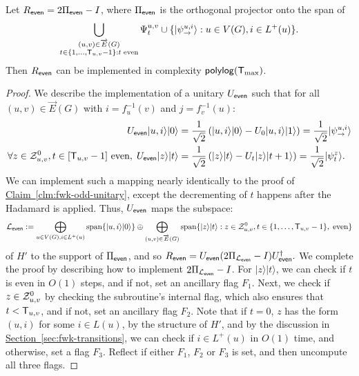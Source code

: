 \documentclass{article}
\renewcommand{\sec}[1]{\hyperref[sec:#1]{Section~\ref*{sec:#1}}}
\newcommand{\clm}[1]{\hyperref[clm:#1]{Claim~\ref*{clm:#1}}}
\def\ket#1{{\lvert}#1\rangle}
\renewcommand{\>}{\rangle}
\newcommand{\<}{\langle}
\renewcommand{\(}{\left(}
\renewcommand{\)}{\right)}
\begin{document}
\begin{claim}\label{clm:fwk-even-unitary}
Let $R_{\sf even} =2\Pi_{\sf even}-I$, where $\Pi_{\sf even}$ is the orthogonal projector onto the span of
$$\bigcup_{\substack{(u,v)\in\overrightarrow{E}(G)\\t\in\{1,\dots,{\sf T}_{u,v}-1\}: t\;\mathrm{ even}}}\Psi_t^{u,v}\cup\{\ket{\psi_{\rightarrow}^{u,i}}:u\in V(G),i\in L^+(u)\}.$$
Then $R_{\sf even}$ can be implemented in complexity ${\sf polylog}({\sf T}_{\max})$. 
\end{claim}
\begin{proof}
We describe the implementation of a unitary $U_{\sf even}$ such that for all $(u,v)\in\overrightarrow{E}(G)$ with $i=f_u^{-1}(v)$ and $j=f_v^{-1}(u)$:
\vskip-18pt
\begin{equation*}
\begin{split}
U_{\sf even}\ket{u,i}\ket{0} &= \frac{1}{\sqrt{2}}\left(\ket{u,i}\ket{0} - U_0\ket{u,i}\ket{1} \right)
= \frac{1}{\sqrt{2}}\ket{\psi_{\rightarrow}^{u,i}}\\
\forall z\in {\cal Z}_{u,v}^0, t\in [{\sf T}_{u,v}-1]\text{ even}, \;%
U_{\sf even}\ket{z}\ket{t} &= \frac{1}{\sqrt{2}}\left(\ket{z}\ket{t} -U_t\ket{z}\ket{t+1}\right) 
= \frac{1}{\sqrt{2}}\ket{\psi_{t}^z}.
\end{split}\label{eq:U-S-1}
\end{equation*}
We can implement such a mapping nearly identically to the proof of \clm{fwk-odd-unitary}, except the decrementing of $t$ happens after the Hadamard is applied. Thus, $U_{\sf even}$ maps the subspace:
$${\cal L}_{\sf even}:=\bigoplus_{u\in V(G), i\in L^+(u)}\mathrm{span}\{\ket{u,i}\ket{0}\}\oplus\bigoplus_{(u,v)\in\overrightarrow{E}(G)}\mathrm{span}\{\ket{z}\ket{t}:z\in{\cal Z}_{u,v}^0,t\in\{1,\dots,{\sf T}_{u,v}-1\},\;\mbox{even}\}$$
of $H'$ to the support of $\Pi_{\sf even}$, and so
$R_{\sf even}=U_{\sf even}(2\Pi_{{\cal L}_{\sf even}}-I)U_{\sf even}^\dagger.$
We complete the proof by describing how to implement $2\Pi_{{\cal L}_{\sf even}}-I$. For $\ket{z}\ket{t}$, we can check if $t$ is even in $O(1)$ steps, and if not, set an ancillary flag $F_1$. Next, we check if $z\in {\cal Z}_{u,v}^0$ by checking the subroutine's internal flag, which also ensures that $t<{\sf T}_{u,v}$, and if not, set an ancillary flag $F_2$. Note that if $t=0$, $z$ has the form $(u,i)$ for some $i\in L(u)$, by the structure of $H'$, and by the discussion in \sec{fwk-transitions}, we can check if $i\in L^+(u)$ in $O(1)$ time, and otherwise, set a flag $F_3$. Reflect if either $F_1$, $F_2$ or $F_3$ is set, and then uncompute all three flags.
\end{proof}
\end{document}
